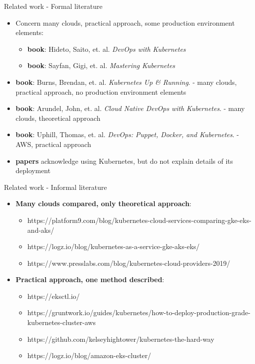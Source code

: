 \documentclass{beamer}
\begin{document}
\begin{frame}{Related work - Formal literature}%
\begin{itemize}
	\item Concern many clouds, practical approach, some production environment elements:
	\begin{itemize}
		\item \textbf{book}: Hideto, Saito, et. al. \textit{DevOps with Kubernetes}
		\item \textbf{book}: Sayfan, Gigi, et. al. \textit{Mastering Kubernetes}
	\end{itemize}
	\item \textbf{book}: Burns, Brendan, et. al. \textit{Kubernetes Up \& Running}. - many clouds, practical approach, no production environment elements
	\item \textbf{book}: Arundel, John, et. al. \textit{Cloud Native DevOps with Kubernetes}. - many clouds, theoretical approach
	\item \textbf{book}: Uphill, Thomas, et. al. \textit{DevOps: Puppet, Docker, and Kubernetes}. - AWS, practical approach
	\item \textbf{papers} acknowledge using Kubernetes, but do not explain details of its deployment
\end{itemize}
\end{frame}

\begin{frame}{Related work - Informal literature}%
\begin{itemize}
	\item \textbf{Many clouds compared, only theoretical approach}:
	\begin{itemize}
		\item https://platform9.com/blog/kubernetes-cloud-services-comparing-gke-eks-and-aks/
		\item https://logz.io/blog/kubernetes-as-a-service-gke-aks-eks/
		\item https://www.presslabs.com/blog/kubernetes-cloud-providers-2019/
	\end{itemize}
	\item \textbf{Practical approach, one method described}:
	\begin{itemize}
		\item https://eksctl.io/
		\item https://gruntwork.io/guides/kubernetes/how-to-deploy-production-grade-kubernetes-cluster-aws
		\item https://github.com/kelseyhightower/kubernetes-the-hard-way
		\item https://logz.io/blog/amazon-eks-cluster/
	\end{itemize}
\end{itemize}
\end{frame}
\end{document}
